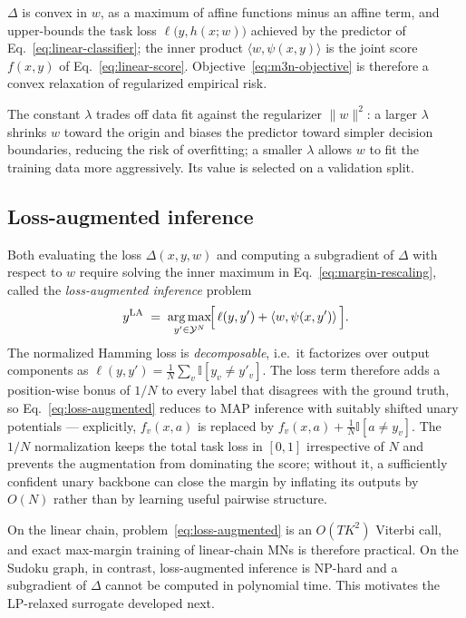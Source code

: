 $\Delta$ is convex in $w$, as a maximum of affine functions minus
an affine term, and upper-bounds the task loss
$\ell\bigl(y, h(x; w)\bigr)$ achieved by the predictor of
Eq.~\eqref{eq:linear-classifier}; the inner product
$\langle w, \psi(x, y)\rangle$ is the joint score $f(x, y)$ of
Eq.~\eqref{eq:linear-score}. Objective~\eqref{eq:m3n-objective} is
therefore a convex relaxation of regularized empirical risk.

The constant $\lambda$ trades off data fit against the regularizer
$\|w\|^{2}$: a larger $\lambda$ shrinks $w$ toward the origin and
biases the predictor toward simpler decision boundaries, reducing
the risk of overfitting; a smaller $\lambda$ allows $w$ to fit the
training data more aggressively. Its value is selected on a
validation split.

\subsection{Loss-augmented inference}

Both evaluating the loss $\Delta(x, y, w)$ and computing a
subgradient of $\Delta$ with respect to $w$ require solving the
inner maximum in Eq.~\eqref{eq:margin-rescaling}, called the
\emph{loss-augmented inference} problem
\begin{equation}
    y^{\mathrm{LA}}
    \;=\; \operatorname*{arg\,max}_{y' \in \mathcal{Y}^{N}}\!
    \Bigl[\, \ell(y, y') + \langle w, \psi(x, y') \rangle \,\Bigr].
    \label{eq:loss-augmented}
\end{equation}
The normalized Hamming loss is \emph{decomposable}, i.e.\ it
factorizes over output components as
$\ell(y, y') = \frac{1}{N}\sum_{v} \mathbb{I}[y_{v} \neq y'_{v}]$.
The loss term therefore adds a position-wise bonus of $1/N$ to
every label that disagrees with the ground truth, so
Eq.~\eqref{eq:loss-augmented} reduces to MAP inference with
suitably shifted unary potentials --- explicitly, $f_v(x, a)$ is
replaced by $f_v(x, a) + \frac{1}{N}\mathbb{I}[a \neq y_v]$. The
$1/N$ normalization keeps the total task loss in $[0, 1]$
irrespective of $N$ and prevents the augmentation from dominating
the score; without it, a sufficiently confident unary backbone can
close the margin by inflating its outputs by $O(N)$ rather than by
learning useful pairwise structure.

On the linear chain, problem~\eqref{eq:loss-augmented} is an
$O(T K^2)$ Viterbi call, and exact max-margin training of
linear-chain MNs is therefore practical. On the Sudoku graph, in
contrast, loss-augmented inference is NP-hard and a subgradient of
$\Delta$ cannot be computed in polynomial time. This motivates the
LP-relaxed surrogate developed next.


